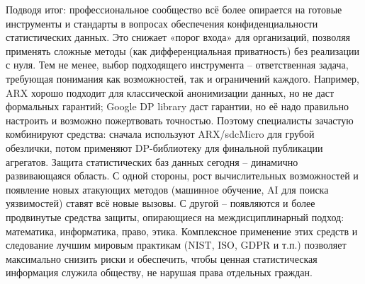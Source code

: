 Подводя итог: профессиональное сообщество всё более опирается на готовые инструменты и стандарты в вопросах обеспечения конфиденциальности статистических данных. Это снижает «порог входа» для организаций, позволяя применять сложные методы (как дифференциальная приватность) без реализации с нуля. Тем не менее, выбор подходящего инструмента – ответственная задача, требующая понимания как возможностей, так и ограничений каждого. Например, ARX хорошо подходит для классической анонимизации данных, но не даст формальных гарантий; Google DP library даст гарантии, но её надо правильно настроить и возможно пожертвовать точностью. Поэтому специалисты зачастую комбинируют средства: сначала используют ARX/sdcMicro для грубой обезлички, потом применяют DP-библиотеку для финальной публикации агрегатов. Защита статистических баз данных сегодня – динамично развивающаяся область. С одной стороны, рост вычислительных возможностей и появление новых атакующих методов (машинное обучение, AI для поиска уязвимостей) ставят всё новые вызовы. С другой – появляются и более продвинутые средства защиты, опирающиеся на междисциплинарный подход: математика, информатика, право, этика. Комплексное применение этих средств и следование лучшим мировым практикам (NIST, ISO, GDPR и т.п.) позволяет максимально снизить риски и обеспечить, чтобы ценная статистическая информация служила обществу, не нарушая права отдельных граждан.